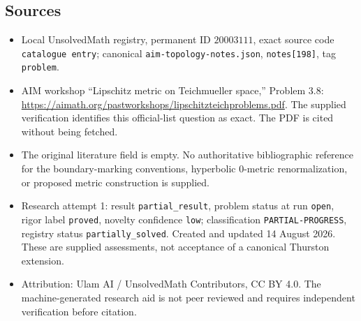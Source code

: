 \documentclass[11pt]{article}
\begin{document}
\subsection{Sources}
\begin{itemize}
\item Local UnsolvedMath registry, permanent ID \(20003111\), exact source code \texttt{catalogue entry}; canonical \texttt{aim-topology-notes.json}, \texttt{notes[198]}, tag \texttt{problem}.
\item AIM workshop ``Lipschitz metric on Teichmueller space,'' Problem 3.8: \url{https://aimath.org/pastworkshops/lipschitzteichproblems.pdf}. The supplied verification identifies this official-list question as exact. The PDF is cited without being fetched.
\item The original literature field is empty. No authoritative bibliographic reference for the boundary-marking conventions, hyperbolic \(0\)-metric renormalization, or proposed metric construction is supplied.
\item Research attempt 1: result \texttt{partial\_result}, problem status at run \texttt{open}, rigor label \texttt{proved}, novelty confidence \texttt{low}; classification \texttt{PARTIAL-PROGRESS}, registry status \texttt{partially\_solved}. Created and updated 14 August 2026. These are supplied assessments, not acceptance of a canonical Thurston extension.
\item Attribution: Ulam AI / UnsolvedMath Contributors, CC BY 4.0. The machine-generated research aid is not peer reviewed and requires independent verification before citation.
\end{itemize}
\end{document}
